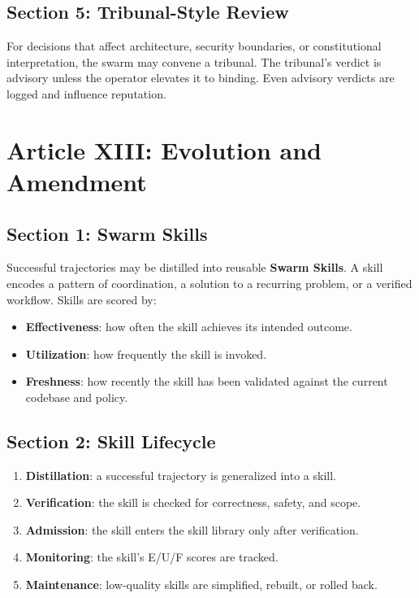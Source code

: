 \documentclass[12pt,letterpaper]{article}
\begin{document}
\subsection{Section 5: Tribunal-Style Review}

For decisions that affect architecture, security boundaries, or constitutional interpretation, the swarm may convene a tribunal. The tribunal's verdict is advisory unless the operator elevates it to binding. Even advisory verdicts are logged and influence reputation.

\section{Article XIII: Evolution and Amendment}
\label{art:evolution}

\subsection{Section 1: Swarm Skills}

Successful trajectories may be distilled into reusable \textbf{Swarm Skills}. A skill encodes a pattern of coordination, a solution to a recurring problem, or a verified workflow. Skills are scored by:

\begin{itemize}
    \item \textbf{Effectiveness}: how often the skill achieves its intended outcome.
    \item \textbf{Utilization}: how frequently the skill is invoked.
    \item \textbf{Freshness}: how recently the skill has been validated against the current codebase and policy.
\end{itemize}

\subsection{Section 2: Skill Lifecycle}

\begin{enumerate}
    \item \textbf{Distillation}: a successful trajectory is generalized into a skill.
    \item \textbf{Verification}: the skill is checked for correctness, safety, and scope.
    \item \textbf{Admission}: the skill enters the skill library only after verification.
    \item \textbf{Monitoring}: the skill's E/U/F scores are tracked.
    \item \textbf{Maintenance}: low-quality skills are simplified, rebuilt, or rolled back.
\end{enumerate}
\end{document}
